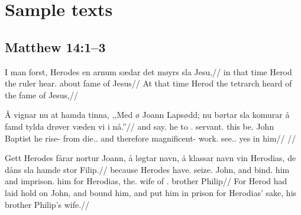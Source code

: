 \chapter{Sample texts}

\section{Matthew 14:1--3}

\pex
\begingl
\gla I man forst, Herodes en arnum sædar det møyrs sla Jesu,//
\glb in that time Herod the ruler hear.\Pst{} about fame of Jesus//
\glft At that time Herod the tetrarch heard of the fame of Jesus,//
\endgl
\xe

\pex
\begingl
\gla Å vignar nu at hamda tinna, ,,Med ø Joann Lapsødd; nu børtar sla komurar å famd tylda drøver væden vi i nå.''//
\glb and say.\Pst{} he to \Refl{}.\Pl{} servant.\Pl{} this be.\Pres{} John Baptist he rise-\Pst{} from die.\PstP{}.\Pl{} and therefore magnificent-\Pl{} work.\Pl{}  see.\Pres{}.\Pass{} yes in him//
//
\endgl 
\xe

\pex
\begingl
\gla Gett Herodes fårar nortur Joann, å løgtar navn, å klassar navn vin Herodias, de dåns sla hamde stor Filip.//
\glb because Herodes have.\Pst{} seize.\PstP{} John, and bind.\Pst{} him and imprison.\Pst{} him for Herodias, the.\F{} wife of \Refl{}.\M{} brother Philip//
\glft For Herod had laid hold on John, and bound him, and put him in prison for Herodias' sake, his brother Philip's wife.//
\endgl
\xe
